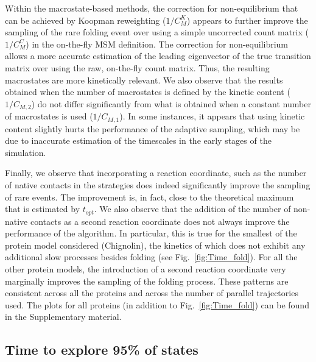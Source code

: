 Within the macrostate-based methods, the correction for non-equilibrium that
can be achieved by Koopman reweighting ($1/C_M^K$) appears to further improve
the sampling of the rare folding event over using a simple uncorrected count
matrix ($1/C_M^C$) in the on-the-fly MSM definition. The correction for
non-equilibrium allows a more accurate estimation of the leading eigenvector of
the true transition matrix over using the raw, on-the-fly count matrix. Thus,
the resulting macrostates are more kinetically relevant. We also observe that
the results obtained when the number of macrostates is defined by the kinetic
content ($1/C_{M, 2}$) do not differ significantly from what is obtained when a constant number
of macrostates is used ($1/C_{M, 1}$). In some instances, it appears that using
kinetic content slightly hurts the performance of the adaptive sampling, which
may be due to inaccurate estimation of the timescales in the early stages
of the simulation.

Finally, we observe that incorporating a reaction coordinate, such as the
number of native contacts in the strategies does indeed significantly improve
the sampling of rare events. The improvement is, in fact, close to the
theoretical maximum that is estimated by $t_{opt}$. We also observe that the
addition of the number of non-native contacts as a second reaction coordinate
does not always improve the performance of the algorithm. In particular, this
is true for the smallest of the protein model considered (Chignolin), the
kinetics of which does not exhibit any additional slow processes besides
folding (see Fig.~\ref{fig:Time_fold}). For all the other protein models, the
introduction of a second reaction coordinate very marginally improves the
sampling of the folding process.
These patterns are consistent across all the proteins and across the number of
parallel trajectories used. The plots for all proteins (in addition to
Fig.~\ref{fig:Time_fold}) can be found in the Supplementary material.


\subsection{\label{sec:time-explore}Time to explore 95\% of states}

